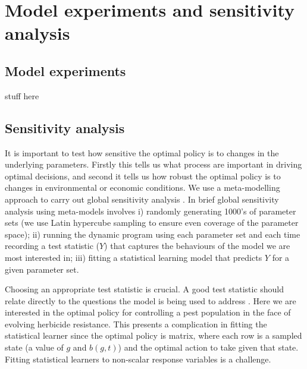 \documentclass[12pt, a4paper]{article}
\begin{document}
\section{Model experiments and sensitivity analysis}
\subsection{Model experiments}
stuff here

\subsection{Sensitivity analysis}
It is important to test how sensitive the optimal policy is to changes in the underlying parameters. Firstly this tells us what process are important in driving optimal decisions, and second it tells us how robust the optimal policy is to changes in environmental or economic conditions. We use a meta-modelling approach to carry out global sensitivity analysis \citep{Cout2014}. In brief global sensitivity analysis using meta-models involves i) randomly generating 1000's of parameter sets (we use Latin hypercube sampling to ensure even coverage of the parameter space); ii) running the dynamic program using each parameter set and each time recording a test statistic ($Y$) that captures the behaviours of the model we are most interested in; iii) fitting a statistical learning model that predicts $Y$ for a given parameter set.

Choosing an appropriate test statistic is crucial. A good test statistic should relate directly to the questions the model is being used to address \citep{Cout2014}. Here we are interested in the optimal policy for controlling a pest population in the face of evolving herbicide resistance. This presents a complication in fitting the statistical learner since the optimal policy is matrix, where each row is a sampled state (a value of $g$ and $b(g, t)$) and the optimal action to take given that state. Fitting statistical learners to non-scalar response variables is a challenge. 
\end{document}
